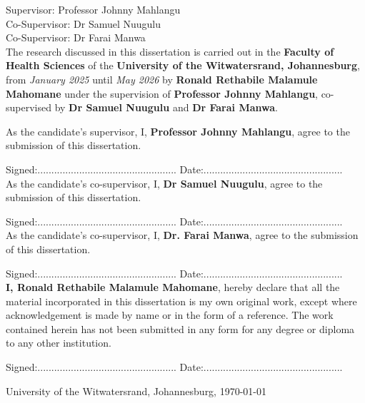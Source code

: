     Supervisor: Professor Johnny Mahlangu\\
    Co-Supervisor: Dr Samuel Nuugulu\\
    Co-Supervisor: Dr Farai Manwa\\[1em]

The research discussed in this dissertation is carried out in the \textbf{Faculty of Health Sciences} of the \textbf{University of the Witwatersrand, Johannesburg}, from \textit{January 2025} until \textit{May 2026} by \textbf{Ronald Rethabile Malamule Mahomane} under the supervision of \textbf{Professor Johnny Mahlangu}, co-supervised by \textbf{Dr Samuel Nuugulu} and \textbf{Dr Farai Manwa}.

As the candidate's supervisor, I, \textbf{Professor Johnny Mahlangu}, agree to the submission of this dissertation. 

Signed:..................................................    Date:..................................................
\\

As the candidate's co-supervisor, I, \textbf{Dr Samuel Nuugulu}, agree to the submission of this dissertation.

Signed:.................................................. Date:..................................................
\\

As the candidate's co-supervisor, I, \textbf{Dr. Farai Manwa}, agree to the submission of this dissertation.

Signed:.................................................. Date:..................................................
\\

\textbf{I, Ronald Rethabile Malamule Mahomane}, hereby declare that all the material incorporated in this dissertation is my own original work, except where acknowledgement is made by name or in the form of a reference. The work contained herein has not been submitted in any form for any degree or diploma to any other institution. 

Signed:..................................................    Date:..................................................

\vfill

\hfill University of the Witwatersrand, Johannesburg, \today